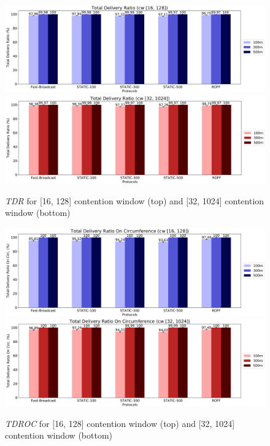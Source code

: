 		\begin{figure}[H]
			\centering
			\includegraphics[width=1.0\textwidth]{immagini/la-25/cw/16/tdr}
			\includegraphics[width=1.0\textwidth]{immagini/la-25/cw/32/tdr}
			\caption{\textit{TDR} for [16, 128] contention window (top) and [32, 1024] contention window (bottom)}
			\label{fig:la-cw-tdr}
		\end{figure}
	
		\begin{figure}[H]
			\centering
			\includegraphics[width=1.0\textwidth]{immagini/la-25/cw/16/tdroc}
			\includegraphics[width=1.0\textwidth]{immagini/la-25/cw/32/tdroc}
			\caption{\textit{TDROC} for [16, 128] contention window (top) and [32, 1024] contention window (bottom)}
			\label{fig:la-cw-tdroc}
		\end{figure}
	
